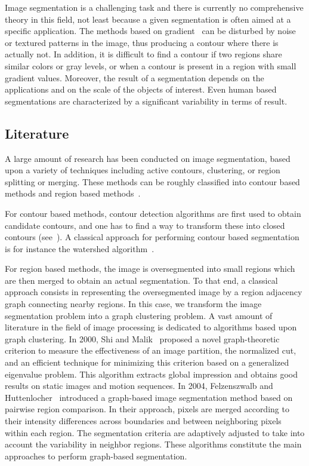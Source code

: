 \documentclass{article}
\begin{document}
        Image segmentation is a challenging task and there is currently no comprehensive theory in this field, not least because a given segmentation is often aimed at a specific application. The methods based on gradient~\cite{watershed1991,arbelaez2011} can be disturbed by noise or textured patterns in the image, thus producing a contour where there is actually not. In addition, it is difficult to find a contour if two regions share similar colors or gray levels, or when a contour is present in a region with small gradient values. Moreover, the result of a segmentation depends on the applications and on the scale of the objects of interest. Even human based segmentations are characterized by a significant variability in terms of result.

    \subsection{Literature}
        A large amount of research has been conducted on image segmentation, based upon a variety of techniques including active contours, clustering, or region splitting or merging. These methods can be roughly classified into contour based methods and region based methods~\cite{arbelaez2011}.
        \par
        For contour based methods, contour detection algorithms are first used to obtain candidate contours, and one has to find a way to transform these into closed contours (see~\cite{ren2005, arbelaez2011}). A classical approach for performing contour based segmentation is for instance the watershed algorithm~\cite{watershed1991}.
        \par
        For region based methods, the image is oversegmented into small regions which are then merged to obtain an actual segmentation. To that end, a classical approach consists in representing the oversegmented image by a region adjacency graph connecting nearby regions. In this case, we transform the image segmentation problem into a graph clustering problem. A vast amount of literature in the field of image processing is dedicated to algorithms based upon graph clustering. In 2000, Shi and Malik~\cite{shi2000} proposed a novel graph-theoretic criterion to measure the effectiveness of an image partition, the normalized cut, and an efficient technique for minimizing this criterion based on a generalized eigenvalue problem. This algorithm extracts global impression and obtains good results on static images and motion sequences. In 2004, Felzenszwalb and Huttenlocher~\cite{felzenszwalb2004} introduced a graph-based image segmentation method based on pairwise region comparison. In their approach, pixels are merged according to their intensity differences across boundaries and between neighboring pixels within each region. The segmentation criteria are adaptively adjusted to take into account the variability in neighbor regions. These algorithms constitute the main approaches to perform graph-based segmentation.
        \bigskip
\end{document}
